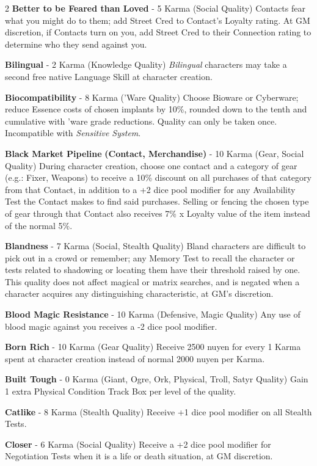 \documentclass[
  oneside]{article}
\begin{document}
\begin{multicols}{2}
\textbf{Better to be Feared than Loved} - 5 Karma
(Social Quality) Contacts fear what you might do
to them; add Street Cred to Contact's Loyalty
rating. At GM discretion, if Contacts turn on you,
add Street Cred to their Connection rating to
determine who they send against you.

\textbf{Bilingual} - 2 Karma (Knowledge Quality)
\emph{Bilingual} characters may take a second free
native Language Skill at character creation.

\textbf{Biocompatibility} - 8 Karma ('Ware
Quality) Choose Bioware or Cyberware; reduce
Essence costs of chosen implants by 10\%, rounded
down to the tenth and cumulative with 'ware grade
reductions. Quality can only be taken once.
Incompatible with \emph{Sensitive System}.

\textbf{Black Market Pipeline} \textbf{(Contact,
Merchandise)} - 10 Karma (Gear, Social Quality)
During character creation, choose one contact and
a category of gear (e.g.: Fixer, Weapons) to
receive a 10\% discount on all purchases of that
category from that Contact, in addition to a +2
dice pool modifier for any Availability Test the
Contact makes to find said purchases. Selling or
fencing the chosen type of gear through that
Contact also receives 7\% x Loyalty value of the
item instead of the normal 5\%.

\textbf{Blandness} - 7 Karma (Social, Stealth
Quality) Bland characters are difficult to pick
out in a crowd or remember; any Memory Test to
recall the character or tests related to shadowing
or locating them have their threshold raised by
one. This quality does not affect magical or
matrix searches, and is negated when a character
acquires any distinguishing characteristic, at
GM's discretion.

\textbf{Blood Magic Resistance} - 10 Karma
(Defensive, Magic Quality) Any use of blood magic
against you receives a -2 dice pool modifier.

\textbf{Born Rich} - 10 Karma (Gear Quality)
Receive 2500 nuyen for every 1 Karma spent at
character creation instead of normal 2000 nuyen
per Karma.

\textbf{Built Tough} - 0 Karma (Giant, Ogre, Ork,
Physical, Troll, Satyr Quality) Gain 1 extra
Physical Condition Track Box per level of the
quality.

\textbf{Catlike} - 8 Karma (Stealth Quality)
Receive +1 dice pool modifier on all Stealth
Tests.

\textbf{Closer} - 6 Karma (Social Quality) Receive
a +2 dice pool modifier for Negotiation Tests when
it is a life or death situation, at GM discretion.


\end{multicols}
\end{document}
